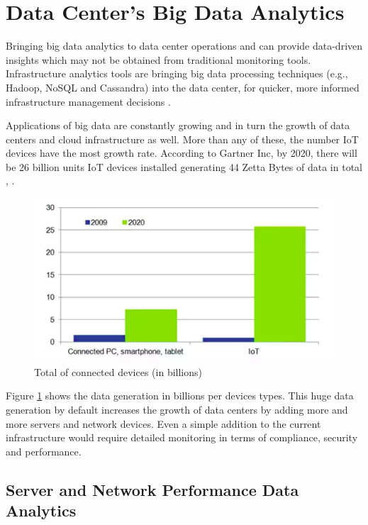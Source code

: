 \documentclass[sigconf]{acmart}
\begin{document}
\section{Data Center's Big Data Analytics}

Bringing big data analytics to data center operations and can provide data-driven insights which may not be obtained from traditional monitoring tools. Infrastructure analytics tools are bringing big data processing techniques (e.g., Hadoop, NoSQL and Cassandra) into the data center, for quicker, more informed infrastructure management decisions \cite{IT-analytics-tools-bring-big-data-to-work-in-the-data-center}.


Applications of big data are constantly growing and in turn the growth of data centers and cloud infrastructure as well. More than any of these, the number IoT devices have the most growth rate. According to Gartner Inc, by 2020, there will be 26 billion units IoT devices installed generating 44 Zetta Bytes of data in total \cite{communications-network-technology-advances}, \cite{digital-universe}.

\begin{figure}[htb]
  \centering
  \includegraphics[width=1.0\columnwidth]{images/Figure2.png}
  \caption{Total of connected devices (in billions) 
  \cite{communications-network-technology-advances}}
  \label{fig:Figure2} 
\end{figure}

Figure \ref{fig:Figure2} shows the data generation in billions per devices types. This huge data generation by default increases the growth of data centers by adding more and more servers and network devices. Even a simple addition to the current infrastructure would require detailed monitoring in terms of compliance, security and performance.


\subsection{Server and Network Performance Data Analytics}
\end{document}
